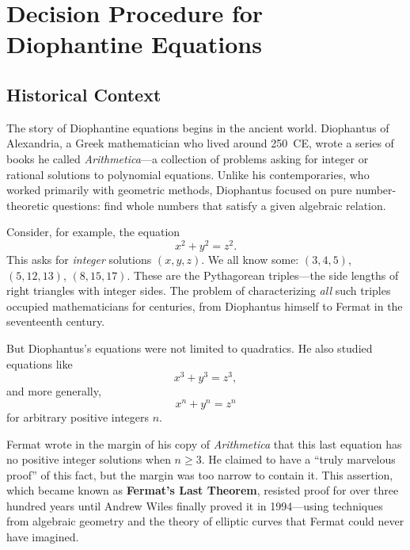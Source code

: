 
\chapter{Decision Procedure for Diophantine Equations}

\section{Historical Context}

The story of Diophantine equations begins in the ancient world. Diophantus of Alexandria, a Greek mathematician who lived around 250~CE, wrote a series of books he called \emph{Arithmetica}---a collection of problems asking for integer or rational solutions to polynomial equations. Unlike his contemporaries, who worked primarily with geometric methods, Diophantus focused on pure number-theoretic questions: find whole numbers that satisfy a given algebraic relation.

Consider, for example, the equation
\[
    x^2 + y^2 = z^2.
\]
This asks for \emph{integer} solutions $(x, y, z)$. We all know some: $(3, 4, 5)$, $(5, 12, 13)$, $(8, 15, 17)$. These are the Pythagorean triples---the side lengths of right triangles with integer sides. The problem of characterizing \emph{all} such triples occupied mathematicians for centuries, from Diophantus himself to Fermat in the seventeenth century.

But Diophantus's equations were not limited to quadratics. He also studied equations like
\[
    x^3 + y^3 = z^3,
\]
and more generally,
\[
    x^n + y^n = z^n
\]
for arbitrary positive integers $n$.

Fermat wrote in the margin of his copy of \emph{Arithmetica} that this last equation has no positive integer solutions when $n \geq 3$. He claimed to have a ``truly marvelous proof'' of this fact, but the margin was too narrow to contain it. This assertion, which became known as \textbf{Fermat's Last Theorem}, resisted proof for over three hundred years until Andrew Wiles finally proved it in 1994---using techniques from algebraic geometry and the theory of elliptic curves that Fermat could never have imagined.


